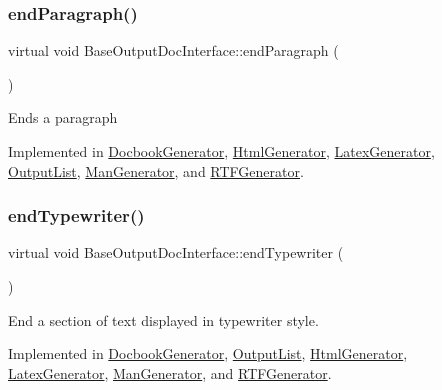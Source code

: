 \mbox{\label{class_base_output_doc_interface_ab76280c2eb451ad160991707206b6c95}} 
\subsubsection{\texorpdfstring{endParagraph()}{endParagraph()}}
{\footnotesize\ttfamily virtual void Base\+Output\+Doc\+Interface\+::end\+Paragraph (\begin{DoxyParamCaption}{ }\end{DoxyParamCaption})\hspace{0.3cm}{\ttfamily [pure virtual]}}

Ends a paragraph 

Implemented in \mbox{\hyperlink{class_docbook_generator_a6f793e8c29984f0ed8d654e9b89110e3}{Docbook\+Generator}}, \mbox{\hyperlink{class_html_generator_a48e5516f348a9ec6ed456a6a3b003af3}{Html\+Generator}}, \mbox{\hyperlink{class_latex_generator_a725c87d183be3801d4ceecb793ecb458}{Latex\+Generator}}, \mbox{\hyperlink{class_output_list_a6523eb013a6f759d505650de41855085}{Output\+List}}, \mbox{\hyperlink{class_man_generator_a7c4c2315a23018eb35413776b36b29e7}{Man\+Generator}}, and \mbox{\hyperlink{class_r_t_f_generator_aefcb5d16655eae184dcacecfd27c0068}{R\+T\+F\+Generator}}.

\mbox{\label{class_base_output_doc_interface_a9e987baf8aed76f0e5e6676b3238d2c8}} 
\subsubsection{\texorpdfstring{endTypewriter()}{endTypewriter()}}
{\footnotesize\ttfamily virtual void Base\+Output\+Doc\+Interface\+::end\+Typewriter (\begin{DoxyParamCaption}{ }\end{DoxyParamCaption})\hspace{0.3cm}{\ttfamily [pure virtual]}}

End a section of text displayed in typewriter style. 

Implemented in \mbox{\hyperlink{class_docbook_generator_a2b987c6b42a8a5b5cea28f950fefa6cc}{Docbook\+Generator}}, \mbox{\hyperlink{class_output_list_ad83302c45e73f387c9dc13789df012f7}{Output\+List}}, \mbox{\hyperlink{class_html_generator_a574b29296b93ffa4c3b119cbee70269c}{Html\+Generator}}, \mbox{\hyperlink{class_latex_generator_a40c84d4660b7514fb336c18544005b52}{Latex\+Generator}}, \mbox{\hyperlink{class_man_generator_a918922201985cac387c671a9767021d1}{Man\+Generator}}, and \mbox{\hyperlink{class_r_t_f_generator_af9e17986de22ddd0b3a4afe4449b4a2c}{R\+T\+F\+Generator}}.

